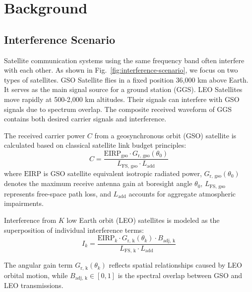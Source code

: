 \documentclass[conference]{IEEEtran}
\begin{document}
\section{Background}
\label{sec:background}

\subsection{Interference Scenario}



Satellite communication systems using the same frequency band often interfere with each other. As shown in Fig.~\ref{fig:interference-scenario}, we focus on two types of satellites. GSO Satellite flies in a fixed position 36,000 km above Earth. It serves as the main signal source for a ground station (GGS). LEO Satellites move rapidly at 500-2,000 km altitudes. Their signals can interfere with GSO signals due to spectrum overlap. The composite received waveform of GGS contains both desired carrier signals and interference.

The received carrier power $C$ from a geosynchronous orbit (GSO) satellite is calculated based on classical satellite link budget principles:
\begin{equation}
    C = \frac{\text{EIRP}_{\text{gso}} \cdot G_{\text{r, gso}}(\theta_0)}{L_{\text{FS, gso}} \cdot L_{\text{add}}}
    \label{eq:carrier_power}
\end{equation}
where $\text{EIRP}$ is GSO satellite equivalent isotropic radiated power, $G_{\text{r, gso}}(\theta_0)$ denotes the maximum receive antenna gain at boresight angle $\theta_0$, $L_{\text{FS, gso}}$ represents free-space path loss, and $L_{\text{add}}$ accounts for aggregate atmospheric impairments.

Interference from $K$ low Earth orbit (LEO) satellites is modeled as the superposition of individual interference terms:
\begin{equation}
    I_k = \frac{\text{EIRP}_k \cdot G_{\text{r, k}}(\theta_k) \cdot B_{\text{adj, k}}}{L_{\text{FS, k}} \cdot L_{\text{add}}}
    \label{eq:interference_power}
\end{equation}

The angular gain term $G_{\text{r, k}}(\theta_k)$ reflects spatial relationships caused by LEO orbital motion, while $B_{\text{adj, k}} \in [0,1]$ is the spectral overlap between GSO and LEO transmissions.
\end{document}
